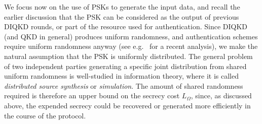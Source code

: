 \documentclass[10pt, a4paper]{article}
\numberwithin{equation}{section} %
\theoremstyle{definition}
\theoremstyle{plain}
\newcommand{\?}{\mathrel{?}} %
\begin{document}
    We focus now on the use of PSKs to generate the input data, and recall the earlier discussion that the PSK can be considered as the output of previous DIQKD rounds, or part of the resource used for authentication. Since DIQKD (and QKD in general) produces uniform randomness, and authentication schemes require uniform randomness anyway (see e.g.~\cite{AuthKeyRecycling} for a recent analysis), we make the natural assumption that the PSK is uniformly distributed. The general problem of two independent parties generating a specific joint distribution from shared uniform randomness is well-studied in information theory, where it is called \emph{distributed source synthesis} or \emph{simulation}. The amount of shared randomness required is therefore an upper bound on the secrecy cost \(L_{\Omega}\), since, as discussed above, the expended secrecy could be recovered or generated more efficiently in the course of the protocol.
\end{document}
